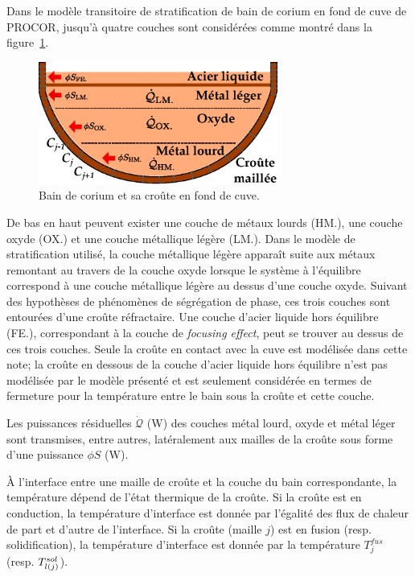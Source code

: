Dans le modèle transitoire de stratification de bain de corium en fond de cuve de PROCOR, jusqu'à quatre couches sont considérées comme montré dans la figure~\ref{fig:bain_corium_croute}. 
\begin{figure}
\centering
\includegraphics[width=0.7\textwidth, keepaspectratio=true]{Figures/bain_corium_croute.eps}
\caption{Bain de corium et sa croûte en fond de cuve.}
\label{fig:bain_corium_croute}
\end{figure}
De bas en haut peuvent exister une couche de métaux lourds (HM.), une couche oxyde (OX.) et une couche métallique légère (LM.). Dans le modèle de stratification utilisé, la couche métallique légère apparaît suite aux métaux remontant au travers de la couche oxyde lorsque le système à l'équilibre correspond à une couche métallique légère au dessus d'une couche oxyde. Suivant des hypothèses de phénomènes de ségrégation de phase, ces trois couches sont entourées d'une croûte réfractaire. Une couche d'acier liquide hors équilibre (FE.), correspondant à la couche de \textit{focusing effect}, peut se trouver au dessus de ces trois couches. Seule la croûte en contact avec la cuve est modélisée dans cette note; la croûte en dessous de la couche d'acier liquide hors équilibre n'est pas modélisée par le modèle présenté et est seulement considérée en termes de fermeture pour la température entre le bain sous la croûte et cette couche. 

Les puissances résiduelles $\dot{\mathcal{Q}}$ (W) des couches métal lourd, oxyde et métal léger sont transmises, entre autres, latéralement aux mailles de la croûte sous forme d'une puissance $\phi S$ (W).

À l'interface entre une maille de croûte et la couche du bain correspondante, la température dépend de l'état thermique de la croûte. Si la croûte est en conduction, la température d'interface est donnée par l'égalité des flux de chaleur de part et d'autre de l'interface. Si la croûte (maille $j$) est en fusion (resp. solidification), la température d'interface est donnée par la température $T_j^{fus}$ (resp. $\temperature[sol]{l(j)}$).

